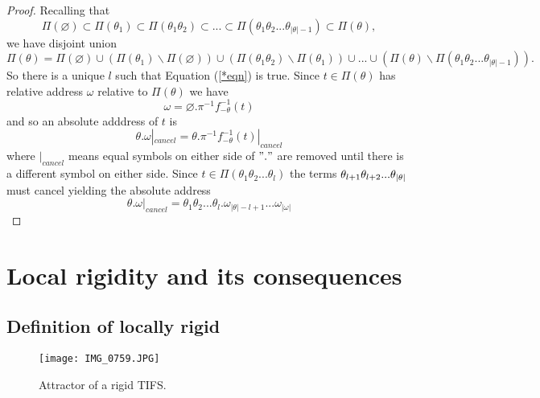 \documentclass{amsproc}
\theoremstyle{plain}
\theoremstyle{definition}
\numberwithin{equation}{section}
\begin{document}
\begin{proof}
Recalling that%
\begin{equation*}
\Pi(\varnothing)\subset\Pi(\theta_{1})\subset\Pi(\theta_{1}\theta_{2})%
\subset...\subset\Pi(\theta_{1}\theta_{2}...\theta_{\left\vert \theta
\right\vert -1})\subset\Pi(\theta),
\end{equation*}
we have disjoint union 
\begin{equation*}
\Pi(\theta)=\Pi(\varnothing)\cup\left( \Pi(\theta_{1})\backslash
\Pi(\varnothing)\right) \cup\left( \Pi(\theta_{1}\theta_{2})\backslash
\Pi(\theta_{1})\right) \cup...\cup\left( \Pi(\theta)\backslash\Pi(\theta
_{1}\theta_{2}...\theta_{\left\vert \theta\right\vert -1})\right) .
\end{equation*}
So there is a unique $l$ such that Equation (\ref{*eqn}) is true. Since $%
t\in\Pi(\theta)$ has relative address $\omega$ relative to $\Pi(\theta)$ we
have 
\begin{equation*}
\omega=\varnothing.\pi^{-1}f_{-\theta}^{-1}(t)
\end{equation*}
and so an absolute adddress of $t$ is 
\begin{equation*}
\theta.\omega|_{cancel}=\theta.\pi^{-1}f_{-\theta}^{-1}(t)|_{cancel}
\end{equation*}
where $|_{cancel}$ means equal symbols on either side of $"."$ are removed
until there is a different symbol on either side. Since $t\in\Pi(\theta
_{1}\theta_{2}...\theta_{l})$ the terms $\theta_{l+1}\theta_{l+2}...\theta_{%
\left\vert \theta\right\vert }$ must cancel yielding the absolute address%
\begin{equation*}
\theta.\omega|_{cancel}=\theta_{1}\theta_{2}...\theta_{l}.\omega
_{|\theta|-l+1}...\omega_{|\omega|}
\end{equation*}
\end{proof}

\section{\label{rigidsec1}Local rigidity and its consequences}

\subsection{Definition of locally rigid}

\begin{figure}[tbp]
\centering%
\texttt{[image: IMG\_0759.JPG]}
\caption{Attractor of a rigid TIFS.}
\label{rigid}
\end{figure}
\end{document}
